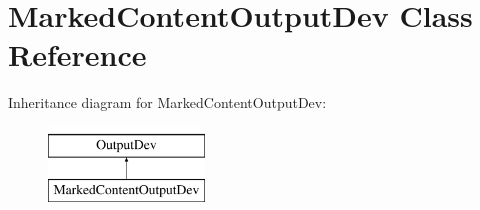 \hypertarget{class_marked_content_output_dev}{}\section{Marked\+Content\+Output\+Dev Class Reference}
\label{class_marked_content_output_dev}
Inheritance diagram for Marked\+Content\+Output\+Dev\+:\begin{figure}[H]
\begin{center}
\leavevmode
\includegraphics[height=2.000000cm]{class_marked_content_output_dev}
\end{center}
\end{figure}
